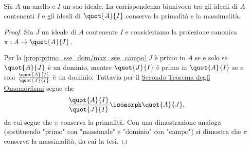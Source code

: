 \begin{corollary}
    Sia $A$ un anello e $I$ un suo ideale. La corrispondenza biunivoca tra gli ideali di $A$ contenenti $I$ e gli ideali di $\quot{A}{I}$ conserva la primalità e la massimalità.
\end{corollary}
\begin{proof}
    Sia $J$ un ideale di $A$ contenente $I$ e consideriamo la proiezione canonica $\pi : A \to \quot{A}{I}$.

    Per la \autoref{prop:primo_sse_dom/max_sse_campo} $J$ è primo in $A$ se e solo se $\quot{A}{J}$ è un dominio, mentre $\quot{J}{I}$ è primo in $\quot{A}{I}$ se e solo $\frac{\quot{A}{I}}{\quot{J}{I}}$ è un dominio. Tuttavia per il \hyperref[th:second_iso_rings]{Secondo Teorema degli Omomorfismi} segue che \[
        \dfrac{\quot{A}{I}}{\quot{J}{I}} \isomorph \quot{A}{J},
    \] da cui segue che $\pi$ conserva la primalità. Con una dimostrazione analoga (sostituendo "primo" con "massimale" e "dominio" con "campo") si dimostra che $\pi$ conserva la massimalità, da cui la tesi.
\end{proof}